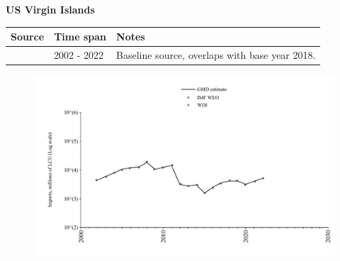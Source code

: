 \documentclass[12pt,a4paper,landscape]{article}
\begin{document}
\begin{adjustbox}{max totalsize={\paperwidth}{\paperheight},center}
\begin{minipage}[t][\textheight][t]{\textwidth}
\vspace*{0.5cm}
{}
\begin{center}
{\Large\bfseries US Virgin Islands}
\end{center}
\vspace{0.5cm}
\begin{table}[H]
\centering
\small
\begin{tabular}{|l|l|l|}
\hline
\textbf{Source} & \textbf{Time span} & \textbf{Notes} \\
\hline
\rowcolor{white}\cite{WDI}& 2002 - 2022 &Baseline source, overlaps with base year 2018.\\
\hline
\end{tabular}
\end{table}
\begin{figure}[H]
\centering
\includegraphics[width=\textwidth,height=0.6\textheight,keepaspectratio]{graphs/VIR_imports.pdf}
\end{figure}
\end{minipage}
\end{adjustbox}
\end{document}
